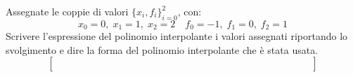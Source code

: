 Assegnate le coppie di valori $\{x_i,f_i \}_{i=0}^2$, con:
\[ x_0=0, \; x_1=1, \; x_2=2 \quad f_0=-1, \; f_1=0, \; f_2=1 \]
\noindent Scrivere l'espressione del polinomio interpolante i 
valori assegnati riportando lo svolgimento e dire la forma del polinomio interpolante 
che \`{e} stata usata. 
\vspace*{5cm}
\[
\left [
\begin{array}{cccccccccccccc}
 \quad &  \quad & \quad &  \quad &  \quad &  \quad &  \quad  \quad & \quad &  \quad & \quad &  \quad & \quad & \quad &  \quad  \\
 \quad & \quad & \quad &  \quad &  \quad &  \quad &  \quad  \quad & \quad &  \quad & \quad &  \quad & \quad & \quad &  \quad \\
 \quad & \quad & \quad &  \quad &  \quad &  \quad &  \quad  \quad & \quad &  \quad & \quad &  \quad & \quad & \quad &  \quad
\end{array}\right]
\]
